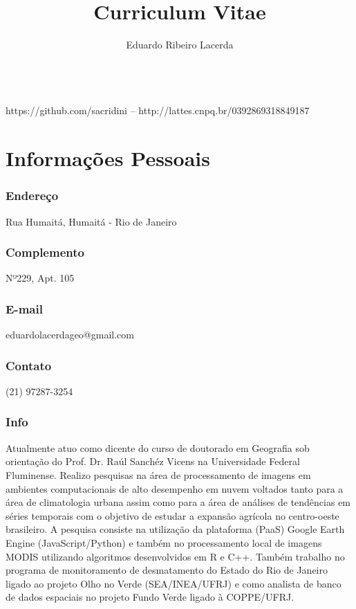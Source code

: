 \documentclass{article}
\renewcommand{\maketitle}{
\begin{center}{
\huge\bfseries
\theauthor
}
\vspace{.25em} \\
https://github.com/sacridini -- http://lattes.cnpq.br/0392869318849187

\end{center}
}
\begin{document}
\title{Curriculum Vitae}
\author{Eduardo Ribeiro Lacerda}
\maketitle


\section{Informações Pessoais}
\subsubsection{Endereço}
Rua Humaitá, Humaitá - Rio de Janeiro
\subsubsection{Complemento}
Nº229, Apt. 105
\subsubsection{E-mail} 
eduardolacerdageo@gmail.com
\subsubsection{Contato}
(21) 97287-3254  \\

\subsubsection{Info}
Atualmente atuo como dicente do curso de doutorado em Geografia sob orientação do Prof. Dr. Raúl Sanchéz Vicens na Universidade Federal Fluminense. Realizo pesquisas na área de processamento de imagens em ambientes computacionais de alto desempenho em nuvem voltados tanto para a área de climatologia urbana assim como para a área de análises de tendências em séries temporais com o objetivo de estudar a expansão agrícola no centro-oeste brasileiro. A pesquisa consiste na utilização da plataforma (PaaS) Google Earth Engine (JavaScript/Python) e também no processamento local de imagens MODIS utilizando algoritmos desenvolvidos em R e C++. Também trabalho no programa de monitoramento de desmatamento do Estado do Rio de Janeiro ligado ao projeto Olho no Verde (SEA/INEA/UFRJ) e como analista de banco de dados espaciais no projeto Fundo Verde ligado à COPPE/UFRJ.

\end{document}
